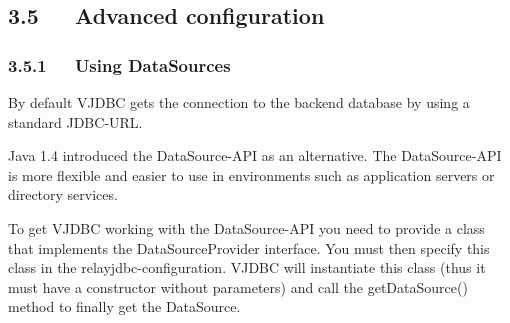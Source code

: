 \documentclass[10pt,a4paper,english]{article}
\begin{document}

\hypertarget{advanced-configuration}{}
\subsection*{3.5~~~Advanced configuration}



\hypertarget{using-datasources}{}
\subsubsection*{3.5.1~~~Using DataSources}

By default VJDBC gets the connection to the backend database by using a standard JDBC-URL.

Java 1.4 introduced the DataSource-API as an alternative. The DataSource-API is more flexible and easier to use in environments such as application servers or directory services.

To get VJDBC working with the DataSource-API you need to provide a class that implements the DataSourceProvider interface. You must then specify this class in the relayjdbc-configuration. VJDBC will instantiate this class (thus it must have a constructor without parameters) and call the getDataSource() method to finally get the DataSource.
\end{document}
